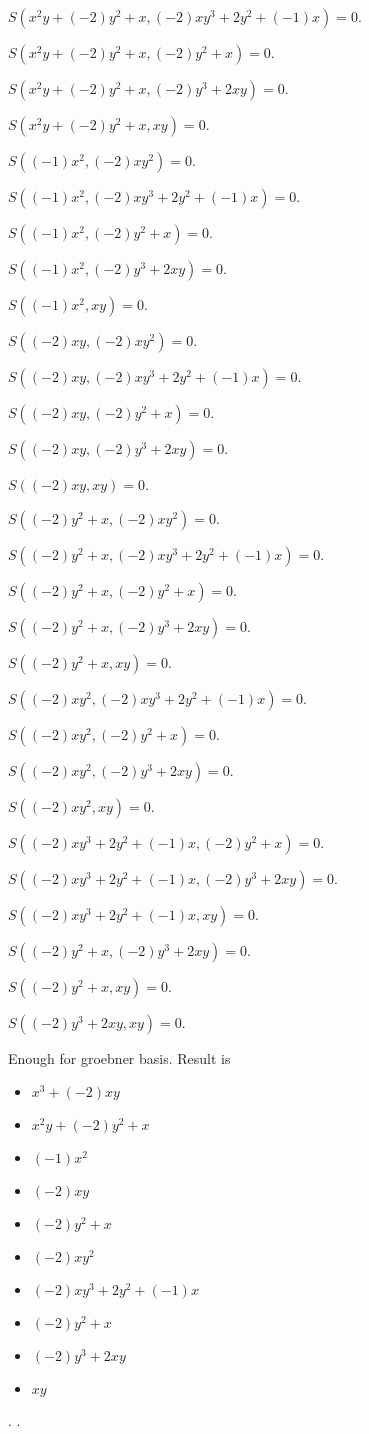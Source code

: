 \documentclass{jsarticle}
\begin{document}
$S(x^{2}y+(-2)y^{2}+x, (-2)xy^{3}+2y^{2}+(-1)x) = 0$.  

$S(x^{2}y+(-2)y^{2}+x, (-2)y^{2}+x) = 0$.  

$S(x^{2}y+(-2)y^{2}+x, (-2)y^{3}+2xy) = 0$.  

$S(x^{2}y+(-2)y^{2}+x, xy) = 0$.  

$S((-1)x^{2}, (-2)xy^{2}) = 0$.  

$S((-1)x^{2}, (-2)xy^{3}+2y^{2}+(-1)x) = 0$.  

$S((-1)x^{2}, (-2)y^{2}+x) = 0$.  

$S((-1)x^{2}, (-2)y^{3}+2xy) = 0$.  

$S((-1)x^{2}, xy) = 0$.  

$S((-2)xy, (-2)xy^{2}) = 0$.  

$S((-2)xy, (-2)xy^{3}+2y^{2}+(-1)x) = 0$.  

$S((-2)xy, (-2)y^{2}+x) = 0$.  

$S((-2)xy, (-2)y^{3}+2xy) = 0$.  

$S((-2)xy, xy) = 0$.  

$S((-2)y^{2}+x, (-2)xy^{2}) = 0$.  

$S((-2)y^{2}+x, (-2)xy^{3}+2y^{2}+(-1)x) = 0$.  

$S((-2)y^{2}+x, (-2)y^{2}+x) = 0$.  

$S((-2)y^{2}+x, (-2)y^{3}+2xy) = 0$.  

$S((-2)y^{2}+x, xy) = 0$.  

$S((-2)xy^{2}, (-2)xy^{3}+2y^{2}+(-1)x) = 0$.  

$S((-2)xy^{2}, (-2)y^{2}+x) = 0$.  

$S((-2)xy^{2}, (-2)y^{3}+2xy) = 0$.  

$S((-2)xy^{2}, xy) = 0$.  

$S((-2)xy^{3}+2y^{2}+(-1)x, (-2)y^{2}+x) = 0$.  

$S((-2)xy^{3}+2y^{2}+(-1)x, (-2)y^{3}+2xy) = 0$.  

$S((-2)xy^{3}+2y^{2}+(-1)x, xy) = 0$.  

$S((-2)y^{2}+x, (-2)y^{3}+2xy) = 0$.  

$S((-2)y^{2}+x, xy) = 0$.  

$S((-2)y^{3}+2xy, xy) = 0$.  

Enough for groebner basis.  Result is \begin{itemize}
\item $x^{3}+(-2)xy$
\item $x^{2}y+(-2)y^{2}+x$
\item $(-1)x^{2}$
\item $(-2)xy$
\item $(-2)y^{2}+x$
\item $(-2)xy^{2}$
\item $(-2)xy^{3}+2y^{2}+(-1)x$
\item $(-2)y^{2}+x$
\item $(-2)y^{3}+2xy$
\item $xy$
\end{itemize}  . 
.  
\end{document}
